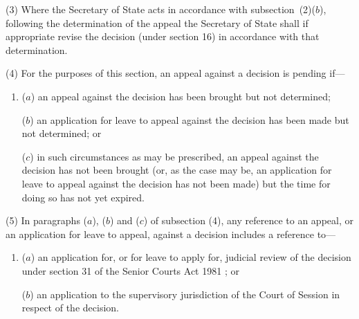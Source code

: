 \documentclass[12pt,a4paper]{article}
\begin{document}
(3) Where the 
Secretary of State  %
acts in accordance with subsection~(2)($b$), following the determination of the appeal 
the Secretary of State  %
shall if appropriate revise 
the  %
decision (under section 16) in accordance with that determination.

(4) For the purposes of this section, an appeal against a decision is pending if—
\begin{enumerate}\item[]
($a$) an appeal against the decision has been brought but not determined;

($b$) an application for leave to appeal against the decision has been made but not determined; or

($c$) in such circumstances as may be prescribed, an appeal against the decision has not been brought (or, as the case may be, an application for leave to appeal against the decision has not been made) but the time for doing so has not yet expired.
\end{enumerate}

(5) In paragraphs ($a$), ($b$) and ($c$) of subsection (4), any reference to an appeal, or an application for leave to appeal, against a decision includes a reference to—
\begin{enumerate}\item[]
($a$) an application for, or for leave to apply for, judicial review of the decision under section 31 of the 
Senior Courts Act 1981%
; or

($b$) an application to the supervisory jurisdiction of the Court of Session in respect of the decision.
\end{enumerate}

\end{document}
